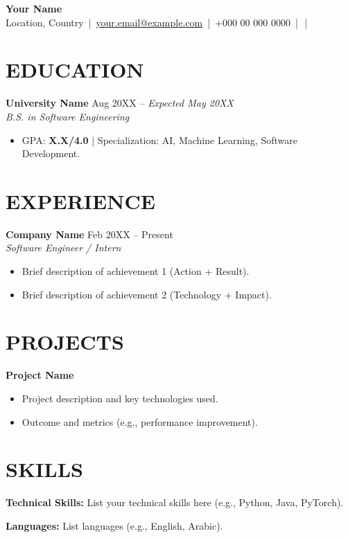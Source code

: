 \documentclass[a4paper,10pt]{article}
\begin{document}
\begin{center}
    {\fontsize{20pt}{20pt}\selectfont \textbf{Your Name}     } \\[8pt]

    
    {\fontsize{10.5pt}{12pt}\selectfont
    Location, Country
    \,|\, 
    \href{mailto:your.email@example.com}{your.email@example.com}
    \,|\, 
    +000 00 000 0000
    \,|\, 
    \href{https://www.linkedin.com/in/your-profile/}{\faLinkedin}
    \,|\, 
    \href{https://github.com/your-username}{\faGithub}}
\end{center}
\vspace{-6pt}

\section*{EDUCATION}

\textbf{University Name} \hfill Aug 20XX -- \textit{Expected May 20XX}\\
\textit{B.S. in Software Engineering}
\begin{itemize}
  \item GPA: \textbf{X.X/4.0} | Specialization: AI, Machine Learning, Software Development.
\end{itemize} 

\section*{EXPERIENCE}

\textbf{Company Name} \hfill Feb 20XX -- Present\\
\textit{Software Engineer / Intern}
\begin{itemize}
  \item Brief description of achievement 1 (Action + Result).
  \item Brief description of achievement 2 (Technology + Impact).
\end{itemize}

\section*{PROJECTS}

\textbf{Project Name}
\begin{itemize}
  \item Project description and key technologies used.
  \item Outcome and metrics (e.g., performance improvement).
\end{itemize}

\section*{SKILLS}
\textbf{Technical Skills:} List your technical skills here (e.g., Python, Java, PyTorch).

\textbf{Languages:} List languages (e.g., English, Arabic).
\end{document}
